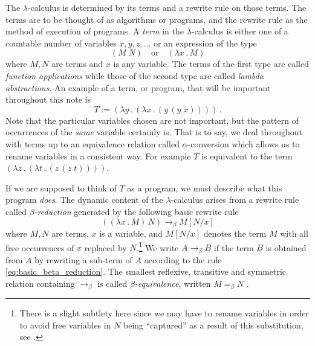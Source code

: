 \documentclass[english,letter paper,12pt,reqno]{article}
\theoremstyle{example}
\begin{document}
The $\lambda$-calculus is determined by its terms and a rewrite rule on those terms. The terms are to be thought of as algorithms or programs, and the rewrite rule as the method of execution of programs. A \emph{term} in the $\lambda$-calculus is either one of a countable number of variables $x,y,z,\ldots$ or an expression of the type
\begin{equation}
(M \; N) \quad \text{or} \quad (\lambda x\,.\, M)
\end{equation}
where $M,N$ are terms and $x$ is any variable. The terms of the first type are called \emph{function applications} while those of the second type are called \emph{lambda abstractions}. An example of a term, or program, that will be important throughout this note is
\begin{equation}
T := ( \lambda y \,.\, ( \lambda x \,.\, (y \,(y \; x))))\,.
\end{equation}
Note that the particular variables chosen are not important, but the pattern of occurrences of the \emph{same} variable certainly is. That is to say, we deal throughout with terms up to an equivalence relation called $\alpha$-conversion which allows us to rename variables in a consistent way. For example $T$ is equivalent to the term $( \lambda z \,.\, ( \lambda t \,.\, (z \,(z \; t))))$.

If we are supposed to think of $T$ as a program, we must describe what this program \emph{does}. The dynamic content of the $\lambda$-calculus arises from a rewrite rule called \emph{$\beta$-reduction} generated by the following basic rewrite rule
\begin{equation}\label{eq:basic_beta_reduction}
( (\lambda x \,.\, M)\, N) \longrightarrow_\beta M[N/x]
\end{equation}
where $M,N$ are terms, $x$ is a variable, and $M[N/x]$ denotes the term $M$ with all free occurrences of $x$ replaced by $N$.\footnote{There is a slight subtlety here since we may have to rename variables in order to avoid free variables in $N$ being ``captured'' as a result of this substitution, see \cite[\S 2.3]{selinger}.} We write $A \rightarrow_\beta B$ if the term $B$ is obtained from $A$ by rewriting a sub-term of $A$ according to the rule \eqref{eq:basic_beta_reduction}. The smallest reflexive, transitive and symmetric relation containing $\rightarrow_\beta$ is called \emph{$\beta$-equivalence}, written $M =_{\beta} N$ \cite[\S 2.5]{selinger}.
\end{document}
